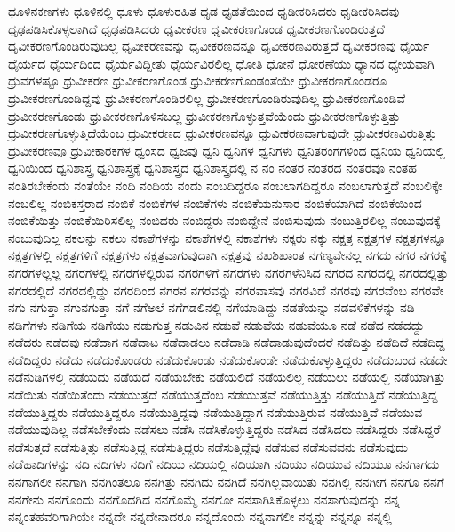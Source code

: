 {ಧೂಳಿನಕಣಗಳು
ಧೂಳಿನಲ್ಲಿ
ಧೂಳು
ಧೂಳುರಹಿತ
ಧೃಡ
ಧೃಡತೆಯಿಂದ
ಧೃಡೀಕರಿಸಿದರು
ಧೃಡೀಕರಿಸಿದವು
ಧೃಢಪಡಿಸಿಕೊಳ್ಳಲಾಗಿದೆ
ಧೃಢಪಡಿಸಿದರು
ಧೃವೀಕರಣ
ಧೃವೀಕರಣಗೊಂಡ
ಧೃವೀಕರಣಗೊಂಡಿರುತ್ತದೆ
ಧೃವೀಕರಣಗೊಂಡಿರುವುದಿಲ್ಲ
ಧೃವೀಕರಣವನ್ನು
ಧೃವೀಕರಣವನ್ನೂ
ಧೃವೀಕರಣವಿರುತ್ತದೆ
ಧೃವೀಕರಣವು
ಧೈರ್ಯ
ಧೈರ್ಯದ
ಧೈರ್ಯದಿಂದ
ಧೈರ್ಯವಿದ್ದೀತು
ಧೈರ್ಯವಿರಲಿಲ್ಲ
ಧೋತಿ
ಧೋನೆ
ಧೋರಣೆಯು
ಧ್ಯಾನದ
ಧ್ಯೇಯವಾಗಿ
ಧ್ರುವಗಳಷ್ಟೂ
ಧ್ರುವೀಕರಣ
ಧ್ರುವೀಕರಣಗೊಂಡ
ಧ್ರುವೀಕರಣಗೊಂಡಂತೆಯೇ
ಧ್ರುವೀಕರಣಗೊಂಡರೂ
ಧ್ರುವೀಕರಣಗೊಂಡಿದ್ದವು
ಧ್ರುವೀಕರಣಗೊಂಡಿರಲಿಲ್ಲ
ಧ್ರುವೀಕರಣಗೊಂಡಿರುವುದಿಲ್ಲ
ಧ್ರುವೀಕರಣಗೊಂಡಿವೆ
ಧ್ರುವೀಕರಣಗೊಂಡು
ಧ್ರುವೀಕರಣಗೊಳಿಸಬಲ್ಲ
ಧ್ರುವೀಕರಣಗೊಳ್ಳುತ್ತವೆಯೆಂದು
ಧ್ರುವೀಕರಣಗೊಳ್ಳುತ್ತಿತ್ತು
ಧ್ರುವೀಕರಣಗೊಳ್ಳುತ್ತಿದೆಯೆಂಬ
ಧ್ರುವೀಕರಣದ
ಧ್ರುವೀಕರಣವನ್ನೂ
ಧ್ರುವೀಕರಣವಾಗುವುದೇ
ಧ್ರುವೀಕರಣವಿರುತ್ತಿತ್ತು
ಧ್ರುವೀಕರಣವೂ
ಧ್ರುವೀಕಾರಕಗಳ
ಧ್ವಂಸದ
ಧ್ವಜವು
ಧ್ವನಿ
ಧ್ವನಿಗಳ
ಧ್ವನಿಗಳು
ಧ್ವನಿತರಂಗಗಳಿಂದ
ಧ್ವನಿಯ
ಧ್ವನಿಯಲ್ಲಿ
ಧ್ವನಿಯಿಂದ
ಧ್ವನಿಶಾಸ್ತ್ರ
ಧ್ವನಿಶಾಸ್ತ್ರಕ್ಕೆ
ಧ್ವನಿಶಾಸ್ತ್ರದ
ಧ್ವನಿಶಾಸ್ತ್ರದಲ್ಲಿ
ನ
ನಂ
ನಂತರ
ನಂತರದ
ನಂತರವೂ
ನಂತಹ
ನಂತಿರಬೇಕೆಂದು
ನಂತೆಯೇ
ನಂದಿ
ನಂದಿಯ
ನಂದು
ನಂಬದಿದ್ದರೂ
ನಂಬಲಾಗದಿದ್ದರೂ
ನಂಬಲಾಗುತ್ತದೆ
ನಂಬಲಿಕ್ಕೇ
ನಂಬಲಿಲ್ಲ
ನಂಬಿಕಸ್ತರಾದ
ನಂಬಿಕೆ
ನಂಬಿಕೆಗಳ
ನಂಬಿಕೆಗಳು
ನಂಬಿಕೆಯನುಸಾರ
ನಂಬಿಕೆಯಾಗಿದೆ
ನಂಬಿಕೆಯಿಂದ
ನಂಬಿಕೆಯಿತ್ತು
ನಂಬಿಕೆಯಿರಿಸಲಿಲ್ಲ
ನಂಬಿದರು
ನಂಬಿದ್ದರು
ನಂಬಿದ್ದೇನೆ
ನಂಬಿಸುವುದು
ನಂಬುತ್ತಿರಲಿಲ್ಲ
ನಂಬುವುದಕ್ಕೆ
ನಂಬುವುದಿಲ್ಲ
ನಕಲನ್ನು
ನಕಲು
ನಕಾಶೆಗಳನ್ನು
ನಕಾಶೆಗಳಲ್ಲಿ
ನಕಾಶೆಗಳು
ನಕ್ಕರು
ನಕ್ಕು
ನಕ್ಷತ್ರ
ನಕ್ಷತ್ರಗಳ
ನಕ್ಷತ್ರಗಳನ್ನೂ
ನಕ್ಷತ್ರಗಳಲ್ಲಿ
ನಕ್ಷತ್ರಗಳಿಗೆ
ನಕ್ಷತ್ರಗಳು
ನಕ್ಷತ್ರವಾಗುವುದಾಗಿ
ನಕ್ಷತ್ರವು
ನಖಶಿಖಾಂತ
ನಗಣ್ಯವೇನಲ್ಲ
ನಗದು
ನಗರ
ನಗರಕ್ಕೆ
ನಗರಗಳಲ್ಲಲ್ಲ
ನಗರಗಳಲ್ಲಿ
ನಗರಗಳಲ್ಲಿರುವ
ನಗರಗಳಿಗೆ
ನಗರಗಳು
ನಗರಗಳೆನಿಸಿದ
ನಗರದ
ನಗರದಲ್ಲಿ
ನಗರದಲ್ಲಿತ್ತು
ನಗರದಲ್ಲಿದೆ
ನಗರದಲ್ಲಿದ್ದು
ನಗರದಿಂದ
ನಗರನ
ನಗರವನ್ನು
ನಗರವಾಸವು
ನಗರವಿದೆ
ನಗರವು
ನಗರವೆಂಬ
ನಗರವೇ
ನಗು
ನಗುತ್ತಾ
ನಗುನಗುತ್ತಾ
ನಗೆ
ನಗೆಅಲೆ
ನಗೆಗಡಲಿನಲ್ಲಿ
ನಗೆಯಾಡಿದ್ದು
ನಡತೆಯನ್ನು
ನಡವಳಿಕೆಗಳನ್ನು
ನಡಿ
ನಡಿಗೆಗಳು
ನಡಿಗೆಯ
ನಡಿಗೆಯು
ನಡುಗುತ್ತ
ನಡುವಿನ
ನಡುವೆ
ನಡುವೆಯ
ನಡುವೆಯೂ
ನಡೆ
ನಡೆದ
ನಡೆದದ್ದು
ನಡೆದರು
ನಡೆದವು
ನಡೆದಾಗ
ನಡೆದಾಟ
ನಡೆದಾಡಲು
ನಡೆದಾಡಿ
ನಡೆದಾಡುವುದೆಂದರೆ
ನಡೆದಿತ್ತು
ನಡೆದಿದೆ
ನಡೆದಿದ್ದ
ನಡೆದಿದ್ದರು
ನಡೆದು
ನಡೆದುಕೊಂಡರು
ನಡೆದುಕೊಂಡು
ನಡೆದುಕೊಂಡೇ
ನಡೆದುಕೊಳ್ಳುತ್ತಿದ್ದರು
ನಡೆದುಬಂದ
ನಡೆದೇ
ನಡೆನುಡಿಗಳಲ್ಲಿ
ನಡೆಯದು
ನಡೆಯದೆ
ನಡೆಯಬೇಕು
ನಡೆಯಲಿದೆ
ನಡೆಯಲಿಲ್ಲ
ನಡೆಯಲು
ನಡೆಯಲ್ಲಿ
ನಡೆಯಾಗಿತ್ತು
ನಡೆಯಿತು
ನಡೆಯಿತೆಂದು
ನಡೆಯುತ್ತದೆ
ನಡೆಯುತ್ತದೆಂಬ
ನಡೆಯುತ್ತವೆ
ನಡೆಯುತ್ತಿತ್ತು
ನಡೆಯುತ್ತಿದೆ
ನಡೆಯುತ್ತಿದ್ದ
ನಡೆಯುತ್ತಿದ್ದರು
ನಡೆಯುತ್ತಿದ್ದರೂ
ನಡೆಯುತ್ತಿದ್ದವು
ನಡೆಯುತ್ತಿದ್ದಾಗ
ನಡೆಯುತ್ತಿರುವ
ನಡೆಯುತ್ತಿವೆ
ನಡೆಯುವ
ನಡೆಯುವುದಿಲ್ಲ
ನಡೆಸಬೇಕೆಂದು
ನಡೆಸಲು
ನಡೆಸಿ
ನಡೆಸಿಕೊಳ್ಳುತ್ತಿದ್ದರು
ನಡೆಸಿದ
ನಡೆಸಿದರು
ನಡೆಸಿದ್ದರು
ನಡೆಸಿದ್ದರೆ
ನಡೆಸುತ್ತದೆ
ನಡೆಸುತ್ತಿತ್ತು
ನಡೆಸುತ್ತಿದ್ದ
ನಡೆಸುತ್ತಿದ್ದರು
ನಡೆಸುತ್ತಿದ್ದೆವು
ನಡೆಸುವ
ನಡೆಸುವವನು
ನಡೆಸುವುದು
ನಡೆಹಾದಿಗಳನ್ನು
ನದಿ
ನದಿಗಳು
ನದಿಗೆ
ನದಿಯ
ನದಿಯಲ್ಲಿ
ನದಿಯಾಗಿ
ನದಿಯು
ನದಿಯುವ
ನದಿಯೂ
ನನಗಾಗದು
ನನಗಾಗಲೀ
ನನಗಾಗಿ
ನನಗಿಂತಲೂ
ನನಗಿತ್ತು
ನನಗಿದು
ನನಗಿದೆ
ನನಗಿಲ್ಲವಾಯಿತು
ನನಗಿಲ್ಲಿ
ನನಗೀಗ
ನನಗೂ
ನನಗೆ
ನನಗೇನು
ನನಗೊಂದು
ನನಗೊದಗಿದ
ನನಗೊಮ್ಮೆ
ನನಗೋ
ನನಸಾಗಿಸಿಕೊಳ್ಳಲು
ನನಸಾಗುವುದನ್ನು
ನನ್ನ
ನನ್ನಂತಹವರಿಗಾಗಿಯೇ
ನನ್ನದೇ
ನನ್ನದೇನಾದರೂ
ನನ್ನದೊಂದು
ನನ್ನನಾಗಲೀ
ನನ್ನನ್ನು
ನನ್ನನ್ನೂ
ನನ್ನಲ್ಲಿ
}
